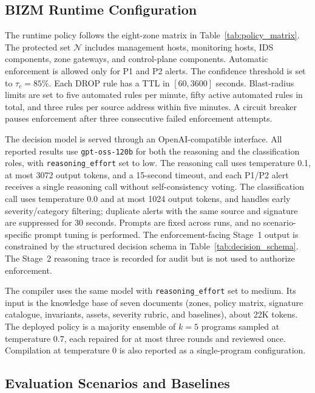 \documentclass[final,5p]{elsarticle}
\begin{document}
\subsection{BIZM Runtime Configuration}
\label{sec:runtime_configuration}

The runtime policy follows the eight-zone matrix in Table~\ref{tab:policy_matrix}. The protected set $\mathcal{N}$ includes management hosts, monitoring hosts, IDS components, zone gateways, and control-plane components. Automatic enforcement is allowed only for P1 and P2 alerts. The confidence threshold is set to $\tau_c=85\%$. Each DROP rule has a TTL in $[60,3600]$ seconds. Blast-radius limits are set to five automated rules per minute, fifty active automated rules in total, and three rules per source address within five minutes. A circuit breaker pauses enforcement after three consecutive failed enforcement attempts.

The decision model is served through an OpenAI-compatible interface. All reported results use \texttt{gpt-oss-120b} for both the reasoning and the classification roles, with \texttt{reasoning\_effort} set to low. The reasoning call uses temperature 0.1, at most 3072 output tokens, and a 15-second timeout, and each P1/P2 alert receives a single reasoning call without self-consistency voting. The classification call uses temperature 0.0 and at most 1024 output tokens, and handles early severity/category filtering; duplicate alerts with the same source and signature are suppressed for 30 seconds. Prompts are fixed across runs, and no scenario-specific prompt tuning is performed. The enforcement-facing Stage~1 output is constrained by the structured decision schema in Table~\ref{tab:decision_schema}. The Stage~2 reasoning trace is recorded for audit but is not used to authorize enforcement.

The compiler uses the same model with \texttt{reasoning\_effort} set to medium. Its input is the knowledge base of seven documents (zones, policy matrix, signature catalogue, invariants, assets, severity rubric, and baselines), about 22K tokens. The deployed policy is a majority ensemble of $k=5$ programs sampled at temperature 0.7, each repaired for at most three rounds and reviewed once. Compilation at temperature 0 is also reported as a single-program configuration.

\subsection{Evaluation Scenarios and Baselines}
\label{sec:scenarios_baselines}
\end{document}
